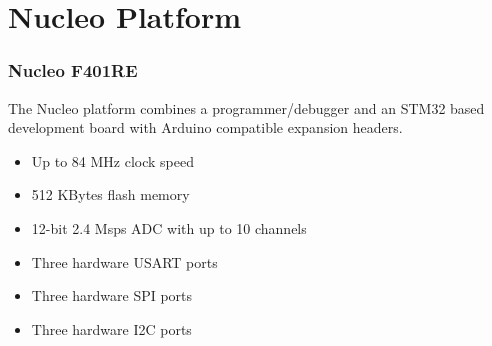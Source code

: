 \section{Nucleo Platform}
\begin{frame}
	\frametitle{Nucleo F401RE}
	The Nucleo platform combines a programmer/debugger and an STM32 based development board with Arduino compatible expansion headers.
	\begin{itemize}
		\item Up to 84 MHz clock speed
		\item 512 KBytes flash memory
		\item 12-bit 2.4 Msps ADC with up to 10 channels
		\item Three hardware USART ports
		\item Three hardware SPI ports
		\item Three hardware I2C ports
	\end{itemize}
\end{frame}
